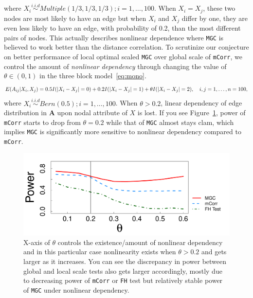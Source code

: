 \documentclass[11pt]{article}
\theoremstyle{definition}
\begin{document}
where $X_{i} \overset{i.i.d}{\sim} Multiple(1/3, 1/3, 1/3); i = 1, \ldots, 100$. When $X_{i} = X_{j}$, these two nodes are most likely to have an edge but when $X_{i}$ and  $X_{j}$ differ by one, they are even less likely to have an edge, with probability of 0.2, than the most different pairs of nodes. This actually describes nonlinear dependence where \texttt{MGC} is believed to work better than the distance correlation. To scrutinize our conjecture on better performance of local optimal scaled \texttt{MGC} over global scale of \texttt{mCorr}, we control the amount of \textit{nonlinear dependency} through changing the value of $\theta \in (0, 1)$ in the three block model~\ref{eq:mono}. 
\begin{equation}
E(A_{ij} | X_{i}, X_{j}) = 0.5 I(|X_{i} - X_{j}| = 0) + 0.2 I(|X_{i} - X_{j}| = 1) + \theta I(|X_{i} - X_{j}| = 2), \quad i,j = 1, \ldots, n = 100, 
\label{eq:mono}
\vspace*{-0.4cm}
\end{equation}
where  $X_{i} \overset{i.i.d}{\sim} Bern(0.5); i =1, \ldots, 100$. When $\theta > 0.2$, linear dependency of edge distribution in $\mathbf{A}$ upon nodal attribute of $X$ is lost. If you see Figure~\ref{fig:powerplot}, power of \texttt{mCorr} starts to drop from $\theta = 0.2$ while that of \texttt{MGC} almost stays clam, which implies \texttt{MGC} is significantly more sensitive to nonlinear dependency compared to \texttt{mCorr}.  
\begin{figure}[ht]
	\centering
	\includegraphics[width=0.7\linewidth]{../Figure/mono_simple.pdf}
	\caption{X-axis of $\theta$ controls the existence/amount of nonlinear dependency and in this particular case nonlinearity exists when $\theta > 0.2$ and gets larger as it increases. You can see the discrepancy in power between global and local scale tests also gets larger accordingly, mostly due to decreasing power of \texttt{mCorr} or \texttt{FH} test but relatively stable power of \texttt{MGC} under nonlinear dependency.}
	\label{fig:powerplot}
\end{figure}
\end{document}
